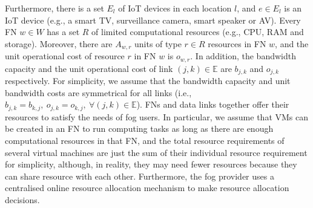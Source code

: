 \documentclass[11pt]{phdthesis}
\begin{document}
Furthermore, there is a set $ E_l $ of IoT devices in each location $ l $, and $ e \in E_l $ is an IoT device (e.g., a smart TV, surveillance camera, smart speaker or AV). Every FN $w \in W$ has a set $R$ of limited computational resources (e.g., CPU, RAM and storage). Moreover, there are $A_{w,r}$ units of type $r \in R$ resources in FN $w$, and the unit operational cost of resource $r$ in FN $w$ is $o_{w,r}$. In addition, the bandwidth capacity and the unit operational cost of link $(j, k) \in \mathbb{E}$ are $b_{j,k}$ and $o_{j,k}$ respectively. 
For simplicity, we assume that the bandwidth capacity and unit bandwidth costs are symmetrical for all links (i.e., $b_{j,k} = b_{k,j},\ o_{j,k} = o_{k,j}, \  \forall (j,k)\in \mathbb{E} $). FNs and data links together offer their resources to satisfy the needs of fog users. 
In particular, we assume that VMs can be created in an FN to run computing tasks as long as there are enough computational resources in that FN, and the total resource requirements of several virtual machines are just the sum of their individual resource requirement for simplicity, although, in reality, they may need fewer resources because they can share resource with each other. 
Furthermore, the fog provider uses a centralised online resource allocation mechanism to make resource allocation decisions.
\end{document}

